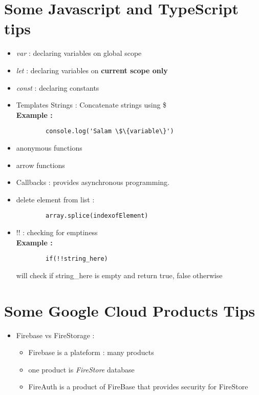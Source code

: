 \documentclass{article}
\begin{document}
\section{Some Javascript and TypeScript tips}
\begin{itemize}
    \item \textit{var} : declaring variables on global scope
    \item \textit{let} : declaring variables on \textbf{current scope only}
    \item \textit{const} : declaring constants
    \item Templates Strings : Concatenate strings using \$
    \\ \textbf{Example : } 
    \begin{lstlisting}  
        console.log('Salam \$\{variable\}')
    \end{lstlisting}
    \item anonymous functions
    \item arrow functions
    
    \item Callbacks : provides asynchronous programming.
    \item delete element from list : 
     \begin{lstlisting}  
        array.splice(indexofElement)
    \end{lstlisting}
   
    \item !! : checking for emptiness 
    \\ \textbf{Example : } 
   
    \begin{lstlisting}  
        if(!!string_here)
    \end{lstlisting}
    will check if string\_here is empty and return true, false otherwise
    
\end{itemize}
\section{Some Google Cloud Products Tips}
\begin{itemize}
    \item Firebase vs FireStorage :
    \begin{itemize}
        \item Firebase is a plateform : many products
        \item one product is \textit{FireStore} database
        \item FireAuth is a product of FireBase that provides security for FireStore
    \end{itemize}
\end{itemize}
\end{document}
